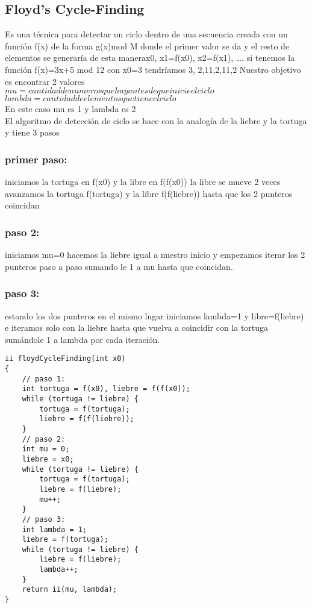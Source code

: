 \subsection{Floyd’s Cycle-Finding}
Es una técnica para detectar un ciclo dentro de una secuencia creada con un función f(x) de la forma g(x)mod M
donde el primer valor se da y el resto de elementos  se generaría de esta manera{x0, x1=f(x0), x2=f(x1),  …},
si tenemos la función f(x)=3x+5 mod 12 con x0=3 tendríamos {3, 2,11,2,11,2} Nuestro objetivo es encontrar 2 valores
\\$mu = cantidad de numeros que hay antes de que inicie el ciclo$
\\$lambda = cantidad de elementos que tiene el ciclo$
\\En este caso mu es 1 y lambda es 2
\\El algoritmo de detección de ciclo se hace con la analogía de la liebre y la tortuga y tiene 3 pasos
\subsubsection{primer paso:}
iniciamos la  tortuga en f(x0) y la libre en f(f(x0)) la libre se mueve 2 veces avanzamos la tortuga f(tortuga) y la libre f(f(liebre)) hasta que los 2 punteros coincidan
\subsubsection{paso 2:}
iniciamos mu=0 hacemos la liebre igual a nuestro inicio y empezamos iterar los 2 punteros paso a paso sumando le 1 a mu hasta que coincidan.
\subsubsection{paso 3:}
estando los dos punteros en el mismo lugar iniciamos lambda=1 y libre=f(liebre)
e iteramos solo con la liebre hasta que vuelva a coincidir con la tortuga sumándole 1 a lambda por cada iteración.
\begin{minipage}{\textwidth}
\begin{lstlisting}[style=C,caption=floydCycleFinding.cpp]
ii floydCycleFinding(int x0)
{
    // paso 1:
    int tortuga = f(x0), liebre = f(f(x0));
    while (tortuga != liebre) {
        tortuga = f(tortuga);
        liebre = f(f(liebre));
    }
    // paso 2:
    int mu = 0;
    liebre = x0;
    while (tortuga != liebre) {
        tortuga = f(tortuga);
        liebre = f(liebre);
        mu++;
    }
    // paso 3:
    int lambda = 1;
    liebre = f(tortuga);
    while (tortuga != liebre) {
        liebre = f(liebre);
        lambda++;
    }
    return ii(mu, lambda);
}
\end{lstlisting}
\end{minipage}
